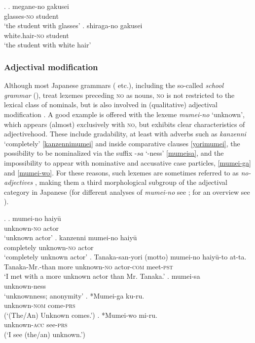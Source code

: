 \ex. \label{alienable} \ag. megane-no gakusei\\
glasses-\textsc{no} student\\
`the student with glasses'
\bg. shiraga-no gakusei\\
white.hair-\textsc{no} student\\
`the student with white hair' \\ \null \hfill \citep[96]{kato:2003:nihongo}

\subsubsection{Adjectival modification}

Although most Japanese grammars (\citealt{iwasaki:2013:japanese, tsujimura:2014:intro, hasegawa:2015:japanese} etc.), including the so-called \textit{school grammar} (\citealt{hashimoto:1948:kokugogaku}), treat lexemes preceding \textsc{no} as nouns, \textsc{no} is not restricted to the lexical class of nominals, but is also involved in (qualitative) adjectival modification \citep{muraki:2012:nihongo, oshima:2019:gradability}. A good example is offered with the lexeme \textit{mumei-no} `unknown’, which appears (almost) exclusively with \textsc{no}, but exhibits clear characteristics of adjectivehood. These include gradability, at least with adverbs such as \textit{kanzenni} `completely’ \ref{kanzennimumei} and inside comparative clauses \ref{yorimumei}, the possibility to be nominalized via the suffix -\textit{sa} `-ness’ \ref{mumeisa}, and the impossibility to appear with nominative and accusative case particles, \ref{mumei-ga} and \ref{mumei-wo}. For these reasons, such lexemes are sometimes referred to as \textit{no-adjectives} \citep{mio:1942:hanashi, mio:1958:hanashi, muraki:2012:nihongo}, making them a third morphological subgroup of the adjectival category in Japanese (for different analyses of \textit{mumei-no} see \citealt{teramura:1982:nihongo, kato:2003:nihongo, morita:2013:morph}; for an overview see \citealt{kohlich:2023:suppl}).

\ex. \ag. mumei-no haiyū\\
unknown-\textsc{no} actor\\
`unknown actor'
\bg. kanzenni mumei-no haiyū\\
completely unknown-\textsc{no} actor\\
`completely unknown actor' \label{kanzennimumei}
\cg. Tanaka-san-yori (motto) mumei-no haiyū-to at-ta.\\
Tanaka-Mr.-than more unknown-\textsc{no} actor-\textsc{com} meet-\textsc{pst}\\
`I met with a more unknown actor than Mr. Tanaka.’ \label{yorimumei}
\dg. mumei-sa\\
unknown-ness\\
`unknownness; anonymity’ \label{mumeisa}
\eg. *Mumei-ga ku-ru.\\
unknown-\textsc{nom} come-\textsc{prs}\\
(`(The/An) Unknown comes.’) \label{mumei-ga}
\fg. *Mumei-wo mi-ru.\\
unknown-\textsc{acc} see-\textsc{prs}\\
(`I see (the/an) unknown.’) \label{mumei-wo}

